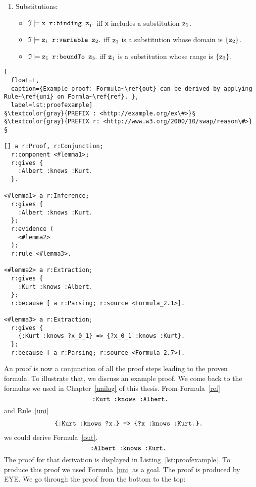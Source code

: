 \begin{definition}
\begin{enumerate}
\begin{itemize}
\item $\mathfrak{I}\models \verb!x r:because y!$. iff \verb!x! is a conjunction elimination and $\verb!y!$ is the proof step which yields the to-be-eliminated conjunction.
\end{itemize}
\item
Substitutions:
\begin{itemize}
 \item $\mathfrak{I}\models \verb!x r:binding z!_1.$ iff \verb!x! includes a substitution $\verb!z!_1$.
 \item $\mathfrak{I}\models \verb!z!_1 \verb! r:variable z!_2.$ iff $\verb!z!_1$ is a substitution whose domain is $\{\verb!z!_2\}$.
 \item $\mathfrak{I}\models \verb!z!_1 \verb! r:boundTo z!_3.$ iff $\verb!z!_1$ is a substitution whose range is $\{\verb!z!_3\}$.
\end{itemize}

\end{enumerate}
\end{definition}


\begin{lstlisting}[
  float=t,
  caption={Example proof: Formula~\ref{out} can be derived by applying Rule~\ref{uni} on Formla~\ref{ref}. },
  label=lst:proofexample]
§\textcolor{gray}{PREFIX : <http://example.org/ex\#>}§
§\textcolor{gray}{PREFIX r: <http://www.w3.org/2000/10/swap/reason\#>}§

[] a r:Proof, r:Conjunction;
  r:component <#lemma1>;
  r:gives {
    :Albert :knows :Kurt.
  }.

<#lemma1> a r:Inference;
  r:gives {
    :Albert :knows :Kurt.
  };
  r:evidence (
    <#lemma2>
  );
  r:rule <#lemma3>.

<#lemma2> a r:Extraction;
  r:gives {
    :Kurt :knows :Albert.
  };
  r:because [ a r:Parsing; r:source <Formula_2.1>].

<#lemma3> a r:Extraction;
  r:gives {
    {:Kurt :knows ?x_0_1} => {?x_0_1 :knows :Kurt}.
  };
  r:because [ a r:Parsing; r:source <Formula_2.7>].
\end{lstlisting}

An \nthree proof is now a conjunction of all the proof steps leading to the proven formula. To illustrate that, we discuss an example proof.
We come back to the formulas we used in Chapter~\ref{unilog} of this thesis. From Formula~\ref{ref}
\[
 \verb! :Kurt :knows :Albert.!
\]
and Rule~\ref{uni}
\begin{multline}\notag
 \texttt{\{:Kurt :knows ?x.\} => }%
 \texttt{\{?x :knows :Kurt.\}.}%
\end{multline}
we could derive Formula~\ref{out}.
\begin{equation}\notag
\texttt{:Albert :knows :Kurt.}
\end{equation}
The proof for that derivation is displayed in Listing~\ref{lst:proofexample}. To produce this proof we used Formula~\ref{uni} as a goal. The proof is produced by EYE.
 We go through the proof from the bottom to the top: 
 
